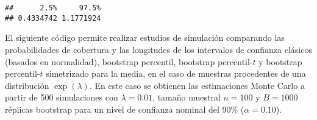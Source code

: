 \documentclass[
]{book}
\newenvironment{Shaded}{\begin{snugshade}}{\end{snugshade}}
\newcommand{\CommentTok}[1]{\textcolor[rgb]{0.56,0.35,0.01}{\textit{#1}}}
\newcommand{\DecValTok}[1]{\textcolor[rgb]{0.00,0.00,0.81}{#1}}
\newcommand{\KeywordTok}[1]{\textcolor[rgb]{0.13,0.29,0.53}{\textbf{#1}}}
\newcommand{\NormalTok}[1]{#1}
\newcommand{\OperatorTok}[1]{\textcolor[rgb]{0.81,0.36,0.00}{\textbf{#1}}}
\newcommand{\StringTok}[1]{\textcolor[rgb]{0.31,0.60,0.02}{#1}}
\theoremstyle{definition}
\theoremstyle{definition}
\theoremstyle{definition}
\theoremstyle{remark}
\let\BeginKnitrBlock\begin \let\EndKnitrBlock\end
\begin{document}
\begin{Shaded}
\end{Shaded}

\begin{verbatim}
##      2.5%     97.5% 
## 0.4334742 1.1771924
\end{verbatim}

\BeginKnitrBlock{example}[Estudio de simulación]
\protect\hypertarget{exm:estudio-sim-exp}{}{\label{exm:estudio-sim-exp} \iffalse (Estudio de simulación) \fi{} } \vspace{0.5cm}

El siguiente código permite realizar estudios de
simulación comparando las probabilidades de cobertura y las longitudes
de los intervalos de confianza clásicos (basados en normalidad),
bootstrap percentil, bootstrap percentil-\(t\) y bootstrap percentil-\(t\)
simetrizado para la media, en el caso de muestras procedentes de una
distribución \(\exp \left( \lambda \right)\).
En este caso se obtienen las estimaciones Monte Carlo a partir de 500
simulaciones con \(\lambda = 0.01\), tamaño muestral \(n=100\) y \(B=1000\) réplicas
bootstrap para un nivel de confianza nominal del 90\% (\(\alpha =0.10\)).
\EndKnitrBlock{example}
\end{document}
